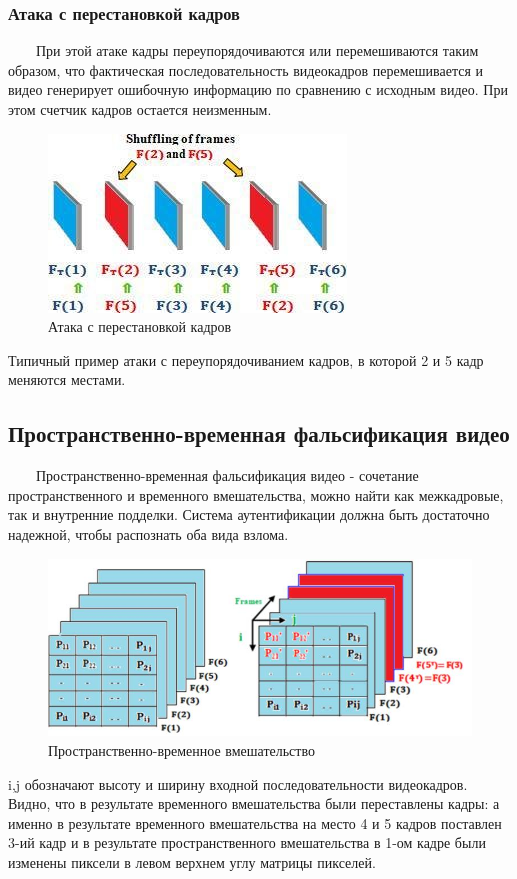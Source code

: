 \documentclass[12pt]{article}
\begin{document}
    \subsubsection{Атака с перестановкой кадров}
        $\qquad$При этой атаке кадры переупорядочиваются или перемешиваются таким образом, что фактическая последовательность видеокадров перемешивается и видео генерирует ошибочную информацию по сравнению с исходным видео. При этом счетчик кадров остается неизменным.
        \newline
        \begin{figure}[h!]
            \centering
            \includegraphics[width = 210 pt] {11.jpg}
            \caption{Атака с перестановкой кадров}
        \end{figure}
        \newline
        Типичный пример атаки с переупорядочиванием кадров, в которой 2 и 5 кадр меняются местами.
    \subsection{Пространственно-временная фальсификация видео}
        $\qquad$Пространственно-временная фальсификация видео - сочетание пространственного и временного вмешательства, можно найти как межкадровые, так и внутренние подделки. Система аутентификации должна быть достаточно надежной, чтобы распознать оба вида взлома.
        \newpage
        \begin{figure}[h!]
            \centering
            \includegraphics[width = 220 pt] {12.jpg}
            \caption{Пространственно-временное вмешательство}
        \end{figure}
        i,j обозначают высоту и ширину входной последовательности видеокадров. Видно, что в результате временного вмешательства были переставлены кадры: а именно в результате временного вмешательства на место 4 и 5 кадров поставлен 3-ий кадр и в результате пространственного вмешательства в 1-ом кадре были изменены пиксели в левом верхнем углу матрицы пикселей.
\end{document}
